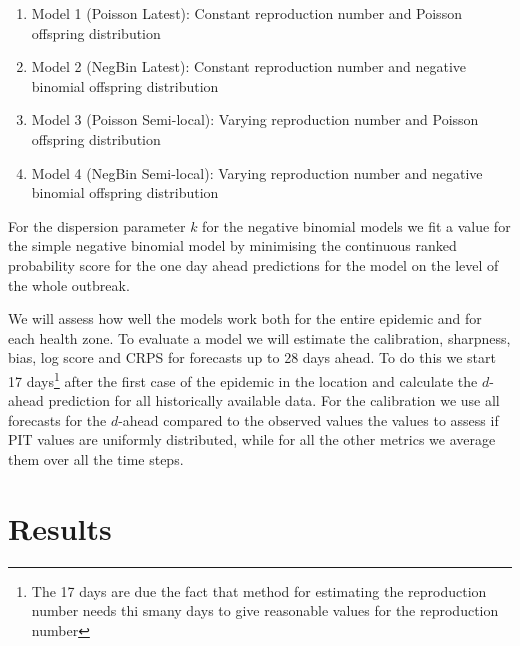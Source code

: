 \documentclass[12pt]{article}
\begin{document}
\begin{enumerate}
\item{Model 1 (Poisson Latest): Constant reproduction number and Poisson offspring distribution}
\item{Model 2 (NegBin Latest): Constant reproduction number and negative binomial offspring distribution}
\item{Model 3 (Poisson Semi-local): Varying reproduction number and Poisson offspring distribution}
\item{Model 4 (NegBin Semi-local): Varying reproduction number and negative binomial offspring distribution}
\end{enumerate}

For the dispersion parameter $k$ for the negative binomial models we fit a value for the simple negative binomial model by minimising the continuous ranked probability score for the one day ahead predictions for the model on the level of the whole outbreak. 

We will assess how well the models work both for the entire epidemic and for each health zone. To evaluate a model we will estimate the calibration, sharpness, bias, log score and CRPS for forecasts up to 28 days ahead. To do this we start 17 days\footnote{The 17 days are due the fact that method for estimating the reproduction number needs thi smany days to give reasonable values for the reproduction number} after the first case of the epidemic in the location and calculate the $d$-ahead prediction for all historically available data. For the calibration we use all forecasts for the $d$-ahead compared to the observed values the values to assess if PIT values are uniformly distributed, while for all the other metrics we average them over all the time steps.



\section{Results}
\end{document}
